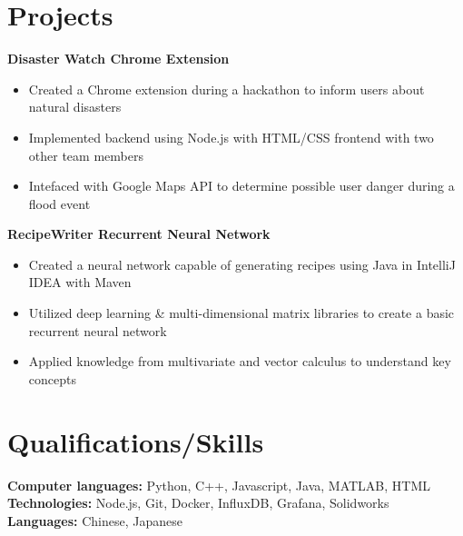 \documentclass[letterpaper,11pt]{article}
\begin{document}
\section{Projects}
\textbf{Disaster Watch Chrome Extension}\\
\begin{itemize}[noitemsep, topsep=0pt, leftmargin=0.7cm]
  \item Created a Chrome extension during a hackathon to inform users about natural disasters
  \item Implemented backend using Node.js with HTML/CSS frontend with two other team members
  \item Intefaced with Google Maps API to determine possible user danger during a flood event
\end{itemize}
\textbf{RecipeWriter Recurrent Neural Network}\\
\begin{itemize}[noitemsep, topsep=0pt, leftmargin=0.7cm]
  \item Created a neural network capable of generating recipes using Java in IntelliJ IDEA with Maven
  \item Utilized deep learning \& multi-dimensional matrix libraries to create a basic recurrent neural network
  \item Applied knowledge from multivariate and vector calculus to understand key concepts
\end{itemize}
\section{Qualifications/Skills}
\textbf{Computer languages:} Python, C++, Javascript, Java, MATLAB, HTML\\
\textbf{Technologies:} Node.js, Git, Docker, InfluxDB, Grafana, Solidworks\\
\textbf{Languages:} Chinese, Japanese\\
\end{document}
